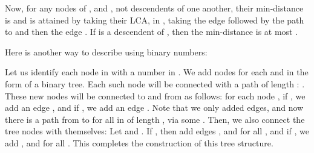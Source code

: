 Now, for any nodes of ,  and , not descendents of one another, their min-distance is  and is attained by taking their LCA,  in , taking the edge  followed by the path to  and then the edge . If  is a descendent of , then the min-distance is at most .

Here is another way to describe  using binary numbers:

Let us identify each node in  with a number in .
We add nodes  for each  and  in the form of a binary tree.
Each such node will be connected with a path of length : .
These new nodes will be connected to and from  as follows:
for each node , if , we add an edge , and if , we add an edge .
Note that we only added  edges, and now there is a path from  to  for all  in  of length , via some .
Then, we also connect the tree nodes with themselves: Let  and . If , then add edges ,  and  for all  , and if , we add ,  and  for all  .
This completes the construction of this tree structure. 



